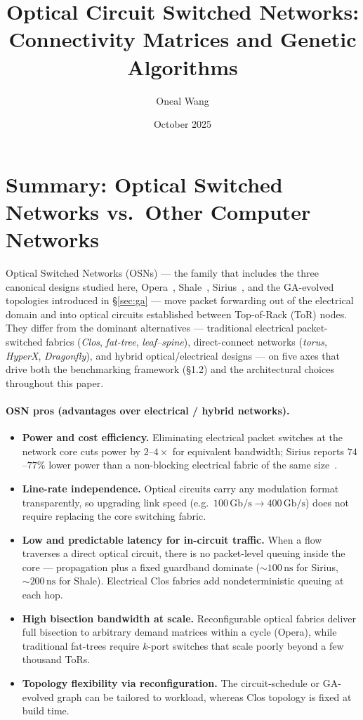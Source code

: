 \documentclass{article}
\title{Optical Circuit Switched Networks: Connectivity Matrices and Genetic Algorithms}
\author{Oneal Wang}
\date{October 2025}
\begin{document}
    \maketitle

    \section{Summary: Optical Switched Networks vs.\ Other Computer Networks}
    \label{sec:osn_summary}

    Optical Switched Networks (OSNs) --- the family that includes the three canonical designs studied here, Opera~\cite{opera}, Shale~\cite{shale}, Sirius~\cite{sirius}, and the GA-evolved topologies introduced in \S\ref{sec:ga} --- move packet forwarding out of the electrical domain and into optical circuits established between Top-of-Rack (ToR) nodes.  They differ from the dominant alternatives --- traditional electrical packet-switched fabrics (\emph{Clos}, \emph{fat-tree}, \emph{leaf--spine}), direct-connect networks (\emph{torus}, \emph{HyperX}, \emph{Dragonfly}), and hybrid optical/electrical designs --- on five axes that drive both the benchmarking framework (\S1.2) and the architectural choices throughout this paper.

    \paragraph{OSN pros (advantages over electrical / hybrid networks).}
    \begin{itemize}
        \item \textbf{Power and cost efficiency.}  Eliminating electrical packet switches at the network core cuts power by $2$--$4\times$ for equivalent bandwidth; Sirius reports $74$--$77\%$ lower power than a non-blocking electrical fabric of the same size~\cite{sirius}.
        \item \textbf{Line-rate independence.}  Optical circuits carry any modulation format transparently, so upgrading link speed (e.g.\ $100\,\text{Gb/s}\to 400\,\text{Gb/s}$) does not require replacing the core switching fabric.
        \item \textbf{Low and predictable latency for in-circuit traffic.}  When a flow traverses a direct optical circuit, there is no packet-level queuing inside the core --- propagation plus a fixed guardband dominate (${\sim}100\,\text{ns}$ for Sirius, ${\sim}200\,\text{ns}$ for Shale).  Electrical Clos fabrics add nondeterministic queuing at each hop.
        \item \textbf{High bisection bandwidth at scale.}  Reconfigurable optical fabrics deliver full bisection to arbitrary demand matrices within a cycle (Opera), while traditional fat-trees require $k$-port switches that scale poorly beyond a few thousand ToRs.
        \item \textbf{Topology flexibility via reconfiguration.}  The circuit-schedule or GA-evolved graph can be tailored to workload, whereas Clos topology is fixed at build time.
    \end{itemize}
\end{document}
